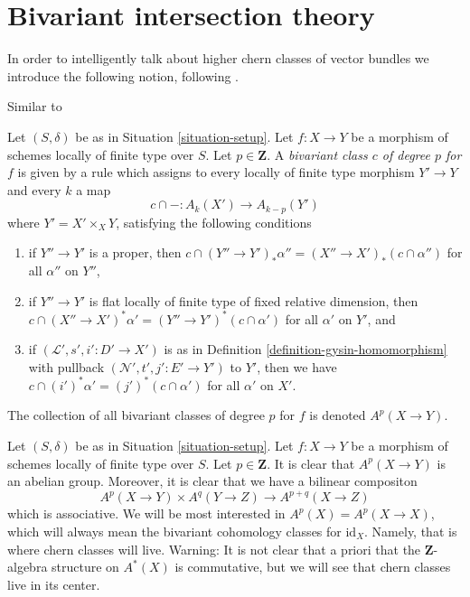 \section{Bivariant intersection theory}
\label{section-bivariant}

\noindent
In order to intelligently talk about higher chern classes of vector
bundles we introduce the following notion, following \cite{FM}.

\begin{definition}
\label{definition-bivariant-class}
\begin{reference}
Similar to \cite[Definition 17.1]{F}
\end{reference}
Let $(S, \delta)$ be as in Situation \ref{situation-setup}.
Let $f : X \to Y$ be a morphism of schemes locally of finite type over $S$.
Let $p \in \mathbf{Z}$.
A {\it bivariant class $c$ of degree $p$ for $f$} is given by a rule
which assigns to every locally of finite type morphism $Y' \to Y$
and every $k$ a map
$$
c \cap - : A_k(X') \longrightarrow A_{k - p}(Y')
$$
where $Y' = X' \times_X Y$, satisfying the following conditions
\begin{enumerate}
\item if $Y'' \to Y'$ is a proper, then
$c \cap (Y'' \to Y')_*\alpha'' = (X'' \to X')_*(c \cap \alpha'')$
for all $\alpha''$ on $Y''$,
\item if $Y'' \to Y'$ is flat locally of finite type of
fixed relative dimension, then
$c \cap (X'' \to X')^*\alpha' = (Y'' \to Y')^*(c \cap \alpha')$
for all $\alpha'$ on $Y'$, and
\item if $(\mathcal{L}', s', i' : D' \to X')$ is as in
Definition \ref{definition-gysin-homomorphism}
with pullback $(\mathcal{N}', t', j' : E' \to Y')$ to $Y'$,
then we have $c \cap (i')^*\alpha' = (j')^*(c \cap \alpha')$
for all $\alpha'$ on $X'$.
\end{enumerate}
The collection of all bivariant classes of degree $p$ for $f$ is
denoted $A^p(X \to Y)$.
\end{definition}

\noindent
Let $(S, \delta)$ be as in Situation \ref{situation-setup}. Let $f : X \to Y$
be a morphism of schemes locally of finite type over $S$. Let
$p \in \mathbf{Z}$. It is clear that $A^p(X \to Y)$ is an abelian group.
Moreover, it is clear that we have a bilinear compositon
$$
A^p(X \to Y) \times A^q(Y \to Z) \to A^{p + q}(X \to Z)
$$
which is associative.
We will be most interested in $A^p(X) = A^p(X \to X)$, which will always mean
the bivariant cohomology classes for $\text{id}_X$. Namely, that is where
chern classes will live.
Warning: It is not clear that a priori that the $\mathbf{Z}$-algebra structure
on $A^*(X)$ is commutative, but we will see that chern classes live
in its center.

